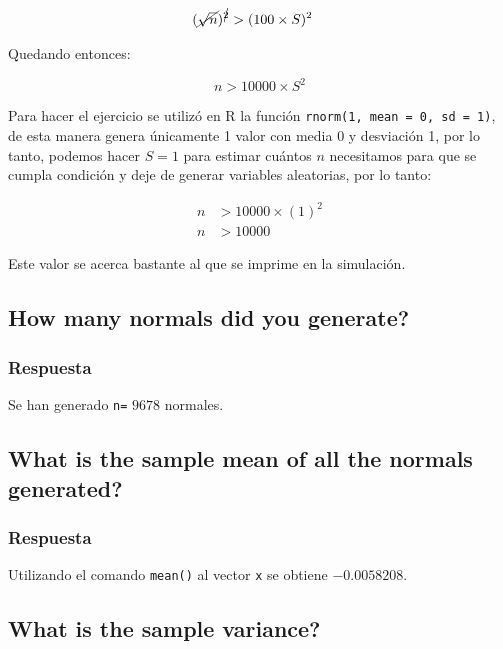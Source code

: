 \documentclass[12pt]{article}\usepackage[]{graphicx}\usepackage[]{xcolor}
\begin{document}
\begin{align*}
  (\cancel{\sqrt{n}})^{\cancel{2}} &> (100 \times S)^{2} 
\end{align*}

Quedando entonces:

\[
n > 10000\times S^{2}
\]

Para hacer el ejercicio se utilizó en \textsf{R} la función \texttt{rnorm(1, mean = 0, sd = 1)}, de esta manera genera únicamente 1 valor con media 0 y desviación 1, por lo tanto, podemos hacer $S = 1$ para estimar cuántos $n$ necesitamos para que se cumpla condición y deje de generar variables aleatorias, por lo tanto:

\begin{align*}
  n &> 10000 \times (1)^{2} \\
  n &> 10000 
\end{align*}

Este valor se acerca bastante al que se imprime en la simulación. 











\subsection{How many normals did you generate?}
\label{subsec:p1-b}

\subsubsection{Respuesta}

Se han generado \lstinline|n=| $9678$ normales.


\subsection{What is the sample mean of all the normals generated?}
\label{subsec:p1-c}




\subsubsection{Respuesta}

Utilizando el comando \lstinline|mean()| al vector \lstinline|x| se obtiene $-0.0058208$. 

\subsection{What is the sample variance?}
\label{subsec:p1-d}
\end{document}

